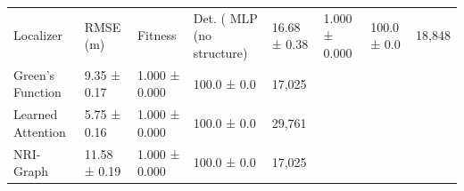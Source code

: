 \begin{tabular}{lllll}
\toprule
Localizer & RMSE (m) & Fitness & Det. (%
\midrule
MLP (no structure) & 16.68 ± 0.38 & 1.000 ± 0.000 & 100.0 ± 0.0 & 18,848 \\
Green's Function & 9.35 ± 0.17 & 1.000 ± 0.000 & 100.0 ± 0.0 & 17,025 \\
Learned Attention & 5.75 ± 0.16 & 1.000 ± 0.000 & 100.0 ± 0.0 & 29,761 \\
NRI-Graph & 11.58 ± 0.19 & 1.000 ± 0.000 & 100.0 ± 0.0 & 17,025 \\
\bottomrule
\end{tabular}
